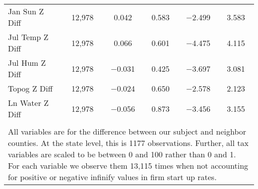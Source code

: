 \begin{table}[!htbp]
\begin{tabular}{@{\extracolsep{5pt}}lccccc}
Jan Sun Z Diff & 12,978 & 0.042 & 0.583 & $-$2.499 & 3.583 \\ 
Jul Temp Z Diff & 12,978 & 0.066 & 0.601 & $-$4.475 & 4.115 \\ 
Jul Hum Z Diff & 12,978 & $-$0.031 & 0.425 & $-$3.697 & 3.081 \\ 
Topog Z Diff & 12,978 & $-$0.024 & 0.650 & $-$2.578 & 2.123 \\ 
Ln Water Z Diff & 12,978 & $-$0.056 & 0.873 & $-$3.456 & 3.155 \\ 
\hline \\[-1.8ex] 
\multicolumn{6}{l}{All variables are for the difference between our subject and neighbor counties. At the state level, this is 1177 observations. Further, all tax variables are scaled to be between 0 and 100 rather than 0 and 1. For each variable we observe them 13,115 times when not accounting for positive or negative infinify values in firm start up rates.} \\ 
\end{tabular} 
\end{table} 
